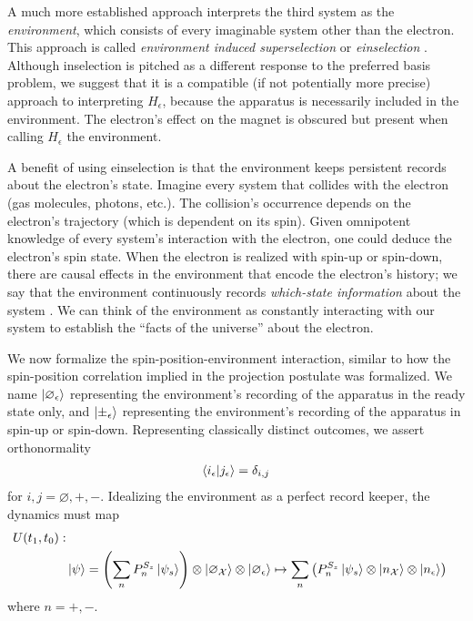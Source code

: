 A much more established approach interprets the third system as the \textit{environment}, which consists of every imaginable system other than the electron. This approach is called \textit{environment induced superselection} or \textit{einselection} \cite{Zurek}. Although inselection is pitched as a different response to the preferred basis problem, we suggest that it is a compatible (if not potentially more precise) approach to interpreting $H_\epsilon$, because the apparatus is necessarily included in the environment. The electron's effect on the magnet is obscured but present when calling $H_\epsilon$ the environment.

A benefit of using einselection is that the environment keeps persistent records about the electron's state. Imagine every system that collides with the electron (gas molecules, photons, etc.). The collision's occurrence depends on the electron's trajectory (which is dependent on its spin). Given omnipotent knowledge of every system's interaction with the electron, one could deduce the electron's spin state. When the electron is realized with spin-up or spin-down, there are causal effects in the environment that encode the electron's history; we say that the environment continuously records \textit{which-state information} about the system \cite{Schlosshauer}. We can think of the environment as constantly interacting with our system to establish the ``facts of the universe'' about the electron.

We now formalize the spin-position-environment interaction, similar to how the spin-position correlation implied in the projection postulate was formalized. We name $\ket{\varnothing_\epsilon}$ representing the environment's recording of the apparatus in the ready state only, and $\ket{\pm_\epsilon}$ representing the environment's recording of the apparatus in spin-up or spin-down. Representing classically distinct outcomes, we assert orthonormality
\begin{align}
  \braket{i_\epsilon | j_\epsilon} = \delta_{i,j}
\end{align}
for $i,j = \varnothing, +, -$.
Idealizing the environment as a perfect record keeper, the dynamics must map
\begin{align} \label{eq: unitary operator inselection}
    \nonumber U(t_1, t_0): \\
    & \ket{\psi} = \left(\sum_{n} P^{S_z}_n\ket{\psi_s}\right) \otimes \ket{\varnothing_\mathcal{X}} \otimes \ket{\varnothing_\epsilon} \mapsto \sum_{n}\left(P^{S_z}_n\ket{\psi_s} \otimes \ket{n_\mathcal{X}} \otimes \ket{n_\epsilon} \right)
\end{align}
where $n= +,-$.

